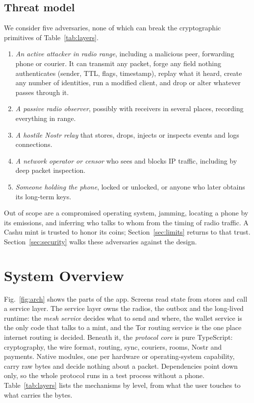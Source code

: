 \documentclass[conference]{IEEEtran}
\begin{document}
\subsection{Threat model}
\label{sec:threat}
We consider five adversaries, none of which can break the cryptographic primitives of Table~\ref{tab:layers}.
{\renewcommand{\labelenumi}{A\arabic{enumi}.}
\begin{enumerate}
\item \emph{An active attacker in radio range}, including a malicious peer, forwarding phone or courier. It can transmit any packet, forge any field nothing authenticates (sender, TTL, flags, timestamp), replay what it heard, create any number of identities, run a modified client, and drop or alter whatever passes through it.
\item \emph{A passive radio observer}, possibly with receivers in several places, recording everything in range.
\item \emph{A hostile Nostr relay} that stores, drops, injects or inspects events and logs connections.
\item \emph{A network operator or censor} who sees and blocks IP traffic, including by deep packet inspection.
\item \emph{Someone holding the phone}, locked or unlocked, or anyone who later obtains its long-term keys.
\end{enumerate}}
Out of scope are a compromised operating system, jamming, locating a phone by its emissions, and inferring who talks to whom from the timing of radio traffic. A Cashu mint is trusted to honor its coins; Section~\ref{sec:limits} returns to that trust. Section~\ref{sec:security} walks these adversaries against the design.

\section{System Overview}
\label{sec:overview}

Fig.~\ref{fig:arch} shows the parts of the app. Screens read state from stores and call a service layer. The service layer owns the radios, the outbox and the long-lived runtime: the \emph{mesh service} decides what to send and where, the wallet service is the only code that talks to a mint, and the Tor routing service is the one place internet routing is decided. Beneath it, the \emph{protocol core} is pure TypeScript: cryptography, the wire format, routing, sync, couriers, rooms, Nostr and payments. Native modules, one per hardware or operating-system capability, carry raw bytes and decide nothing about a packet. Dependencies point down only, so the whole protocol runs in a test process without a phone. Table~\ref{tab:layers} lists the mechanisms by level, from what the user touches to what carries the bytes.
\end{document}
